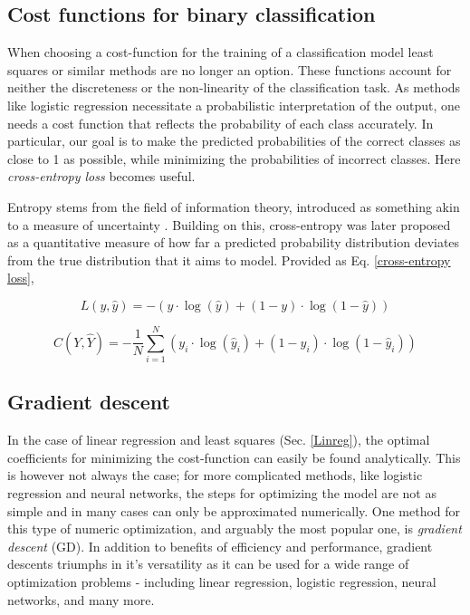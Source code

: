 \subsection{Cost functions for binary classification }

When choosing a cost-function for the training of a classification model least squares or similar methods are no longer an option. These functions account for neither the discreteness or the non-linearity of the classification task. 
As methods like logistic regression necessitate a probabilistic interpretation of the output, one needs a cost function that reflects the probability of each class accurately. In particular, our goal is to make the predicted probabilities of the correct classes as close to 1 as possible, while minimizing the probabilities of incorrect classes. Here \textit{cross-entropy loss} becomes useful.

Entropy stems from the field of information theory, introduced as something akin to a measure of uncertainty \cite{Shore}. Building on this, cross-entropy was later proposed as a quantitative measure of how far a predicted probability distribution deviates from the true distribution that it aims to model. Provided as Eq. \ref{cross-entropy loss},

\begin{equation}\label{cross-entropy loss}
    L(y, \hat{y}) = - \left( y \cdot \log(\hat{y}) + (1 - y) \cdot \log(1 - \hat{y}) \right)
\end{equation}

\begin{equation}\label{cross-entropy cost}
    C(Y, \hat{Y}) = - \frac{1}{N} \sum_{i=1}^{N} \left( y_i \cdot \log(\hat{y}_i) + (1 - y_i) \cdot \log(1 - \hat{y}_i) \right)
\end{equation}
\subsection{Gradient descent}
In the case of linear regression and least squares (Sec. \ref{Linreg}), the optimal coefficients for minimizing the cost-function can easily be found analytically. This is however not always the case; for more complicated methods, like logistic regression and neural networks, the steps for optimizing the model are not as simple and in many cases can only be approximated numerically.  
One method for this type of numeric optimization, and arguably the most popular one, is \textit{gradient descent} (GD). In addition to benefits of efficiency and performance, gradient descents triumphs in it's versatility as it can be used for a wide range of optimization problems - including linear regression, logistic regression, neural networks, and many more. 


